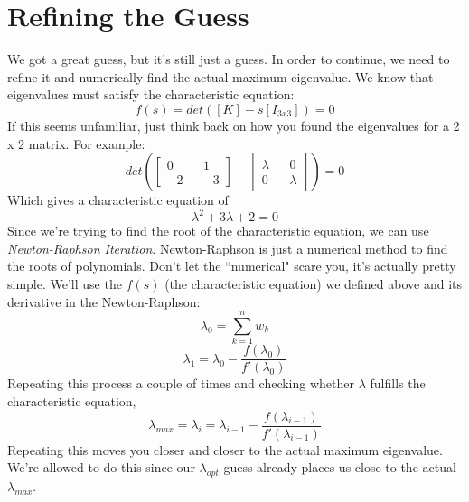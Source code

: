 \documentclass[a4paper,14pt]{extreport}
\begin{document}
\section{Refining the Guess}
We got a great guess, but it's still just a guess. In order to continue, we need to refine it and numerically find the actual maximum eigenvalue. We know that eigenvalues must satisfy the characteristic equation:
\[
f(s) = det([K]-s[I_{3x3}]) = 0
\]
If this seems unfamiliar, just think back on how you found the eigenvalues for a 2 x 2 matrix. For example:
\[
det(
\begin{bmatrix}
0&&1\\-2&&-3
\end{bmatrix} - 
\begin{bmatrix}
\lambda&&0\\0&&\lambda
\end{bmatrix}) = 0
\]
Which gives a characteristic equation of
\[
\lambda^2+3\lambda+2=0
\]
Since we're trying to find the root of the characteristic equation, we can use \emph{Newton-Raphson Iteration}. Newton-Raphson is just a numerical method to find the roots of polynomials. Don't let the ``numerical" scare you, it's actually pretty simple. We'll use the $f(s)$  (the characteristic equation) we defined above and its derivative in the Newton-Raphson:
\[
\lambda_0 = \sum^n_{k=1} w_k
\]
\[
\lambda_1 = \lambda_0 - \dfrac{f(\lambda_0)}{f'(\lambda_0)}
\]
Repeating this process a couple of times and checking whether $\lambda$ fulfills the characteristic equation,
\[
\lambda_{max} = \lambda_i = \lambda_{i-1} - \dfrac{f(\lambda_{i-1})}{f'(\lambda_{i-1})}
\]
Repeating this moves you closer and closer to the actual maximum eigenvalue. We're allowed to do this since our $\lambda_{opt}$ guess already places us close to the actual $\lambda_{max}$.
\end{document}
